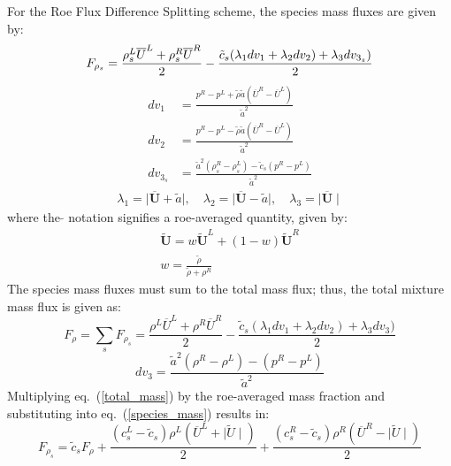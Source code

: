 \documentclass{article}   	%
\begin{document}
For the Roe Flux Difference Splitting scheme, the species mass fluxes are given by:
%
\begin{equation}
	F_{\rho_s} = \frac{\rho_s^L\overline{U}^L+\rho_s^R\overline{U}^R}{2}
	-\frac{\tilde{c}_s(\lambda_1 dv_1 + \lambda_2 dv_2)+\lambda_3 dv_{3_s})}{2}
  \label{species_mass} \\
\end{equation}
\begin{align}	
		dv_1 &= \frac{p^R-p^L+\tilde{\rho} \tilde{a} (\overline{U}^R-\overline{U}^L)}{\tilde{a}^2} \\
		dv_2 &= \frac{p^R-p^L-\tilde{\rho} \tilde{a} (\overline{U}^R-\overline{U}^L)}{\tilde{a}^2} \\
		dv_{3_s} &= \frac{\tilde{a}^2 (\rho_s^R-\rho_s^L)- \tilde{c}_s (p^R-p^L)}{\tilde{a}^2}
\end{align}
\begin{align}
	\lambda_1 = \mid\mathbf{\overline{U}}+\tilde{a} \mid,\quad 
	\lambda_2 = \mid \mathbf{\overline{U}}-\tilde{a} \mid,\quad 
	\lambda_3 =  \mid \mathbf{\overline{U}} \mid
\end{align}
%
where the $\tilde{}$ notation signifies a roe-averaged quantity, given by:
%
\begin{gather}
	\mathbf{\tilde{U}} =w\mathbf{\tilde{U}}^L+(1-w)\mathbf{\tilde{U}}^R \\
	w = \frac{\tilde{\rho}}{\tilde{\rho}+\rho^R}
\end{gather}
%
The species mass fluxes must sum to the total mass flux; thus, the total mixture mass flux is given as:
%
\begin{equation}
\label{total_mass}
	F_\rho = \sum\limits_{s}{F_{\rho_s}} = \frac{\rho^L\overline{U}^L+\rho^R\overline{U}^R}{2}
	-\frac{\tilde{c}_s(\lambda_1 dv_1 + \lambda_2 dv_2)+\lambda_3 dv_3)}{2}
\end{equation}
\begin{equation}
	dv_3 = \frac{\tilde{a}^2 (\rho^R-\rho^L)-(p^R-p^L)}{\tilde{a}^2}
\end{equation}
%
Multiplying eq.~(\ref{total_mass}) by the roe-averaged mass fraction and substituting into eq.~(\ref{species_mass}) results in:
%
\begin{equation}
\label{unsimp_sp_flux}
	F_{\rho_s} =\tilde{c}_s F_\rho + \frac{(c_s^L-\tilde{c}_s)\rho^L(\overline{U}^L+\mid \tilde{U}\mid)}{2}
	+ \frac{(c_s^R-\tilde{c}_s)\rho^R(\overline{U}^R-\mid \tilde{U}\mid)}{2}
\end{equation}
\end{document}
